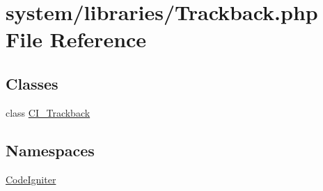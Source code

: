 \hypertarget{_trackback_8php}{}\section{system/libraries/\+Trackback.php File Reference}
\label{_trackback_8php}
\subsection*{Classes}
\begin{DoxyCompactItemize}
\item 
class \mbox{\hyperlink{class_c_i___trackback}{C\+I\+\_\+\+Trackback}}
\end{DoxyCompactItemize}
\subsection*{Namespaces}
\begin{DoxyCompactItemize}
\item 
 \mbox{\hyperlink{namespace_code_igniter}{Code\+Igniter}}
\end{DoxyCompactItemize}
